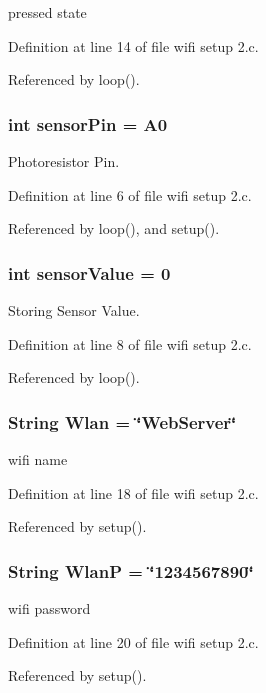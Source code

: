 pressed state 



Definition at line 14 of file wifi setup 2.c.

Referenced by loop().
\subsubsection{\setlength{\rightskip}{0pt plus 5cm}int {\bf sensor\-Pin} = A0}\label{wifi_01setup_012_8c_6aec6a9612b22e1cec48b35427ba4a47}


Photoresistor Pin. 



Definition at line 6 of file wifi setup 2.c.

Referenced by loop(), and setup().
\subsubsection{\setlength{\rightskip}{0pt plus 5cm}int {\bf sensor\-Value} = 0}\label{wifi_01setup_012_8c_6ad49bffab166dc28073d341bf3caacb}


Storing Sensor Value. 



Definition at line 8 of file wifi setup 2.c.

Referenced by loop().
\subsubsection{\setlength{\rightskip}{0pt plus 5cm}String {\bf Wlan} = \char`\"{}Web\-Server\char`\"{}}\label{wifi_01setup_012_8c_60409476e8b89d8184cb4a12478eb2d8}


wifi name 



Definition at line 18 of file wifi setup 2.c.

Referenced by setup().
\subsubsection{\setlength{\rightskip}{0pt plus 5cm}String {\bf Wlan\-P} = \char`\"{}1234567890\char`\"{}}\label{wifi_01setup_012_8c_8f40303d7f1ad878da7f726d975bbf3d}


wifi password 



Definition at line 20 of file wifi setup 2.c.

Referenced by setup().